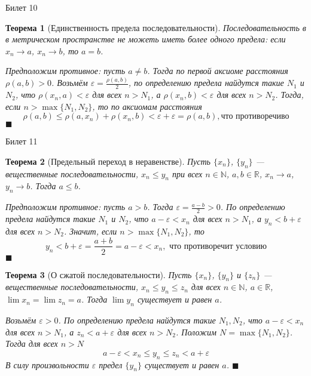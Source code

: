 \documentclass[12pt,a4paper]{article}
\newtheorem*{theorem*}{Теорема}
\begin{document}
\begin{center}
Билет 10
\end{center}

\begin{theorem*}[Единственность предела последовательности]
\label{10.1}
Последовательность в в метрическом пространстве не можеть иметь более одного предела: если $x_n \rightarrow a$, $x_n \rightarrow b$, то $a=b$.

Предположим противное: пусть $a \ne b$. Тогда по первой аксиоме расстояния $\rho(a, b) > 0$. Возьмём $\varepsilon = \frac{\rho(a, b)}{2}$, по определению предела найдутся такие $N_1$ и $N_2$, что $\rho(x_n, a) < \varepsilon$ для всех $n > N_1$, а $\rho(x_n, b) < \varepsilon$ для всех $n > N_2$. Тогда, если $n>\max\{N_1, N_2\}$, то по аксиомам расстояния
$$
\rho(a, b) \leq \rho(a, x_n) + \rho(x_n, b) < \varepsilon + \varepsilon = \rho(a, b), \text{что противоречиво}
$$ $\blacksquare$
\end{theorem*}

\begin{center}
Билет 11
\end{center}

\begin{theorem*}[Предельный переход в неравенстве]
\label{11.1}
Пусть $\{ x_n \}$, $\{ y_n \}$ --- вещественные последовательности, $x_n \leq y_n$ при всех $n \in \mathbb{N}$, $a, b \in \mathbb{R}$, $x_n \rightarrow a$, $y_n \rightarrow b$. Тогда $a \leq b$. 

Предположим противное: пусть $a > b$. Тогда $\varepsilon = \frac{a-b}{2} > 0$. По определению предела найдутся такие $N_1$ и $N_2$, что $a-\varepsilon < x_n$ для всех $n > N_1$, а $y_n < b + \varepsilon$ для всех $n > N_2$. Значит, если $n > \max\{N_1, N_2\}$, то
$$
y_n < b + \varepsilon=\frac{a+b}{2}=a-\varepsilon<x_n, \text{ что противоречит условию}
$$ $\blacksquare$
\end{theorem*}

\begin{theorem*}[О сжатой последовательности]
\label{11.2}
Пусть $\{ x_n \}$, $\{ y_n \}$ и $\{ z_n \}$ --- вещественные последовательности, $x_n \leq y_n \leq z_n$ для всех $n \in \mathbb{N}$, $a \in \mathbb{R}$, $\lim x_n = \lim z_n = a$. Тогда $\lim y_n$ существует и равен $a$.

Возьмём $\varepsilon > 0$. По определению предела найдутся такие $N_1, N_2$, что $a - \varepsilon < x_n$ для всех $n > N_1$, а $z_n < a + \varepsilon$ для всех $n > N_2$. Положим $N = \max\{N_1, N_2\}$. Тогда для всех $n > N$
$$
a - \varepsilon < x_n \leq y_n \leq z_n < a + \varepsilon
$$
В силу произвольности $\varepsilon$ предел $\{y_n\}$ существует и равен $a$. $\blacksquare$
\end{theorem*}
\end{document}
